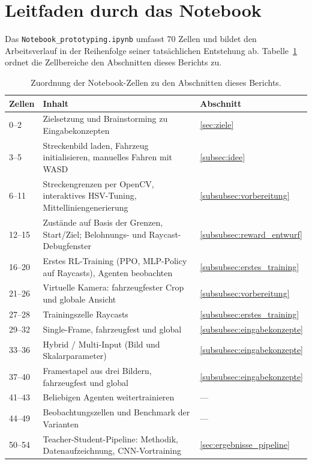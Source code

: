 \section{Leitfaden durch das Notebook}

Das \texttt{Notebook\_prototyping.ipynb} umfasst \num{70} Zellen und bildet den Arbeitsverlauf in der Reihenfolge seiner tatsächlichen Entstehung ab. Tabelle~\ref{tab:notebook} ordnet die Zellbereiche den Abschnitten dieses Berichts zu.

\begin{table}[htbp]
  \centering
  \caption{Zuordnung der Notebook-Zellen zu den Abschnitten dieses Berichts.}
  \label{tab:notebook}
  \small
  \begin{tabularx}{\linewidth}{@{}l X l@{}}
    \toprule
    \textbf{Zellen} & \textbf{Inhalt} & \textbf{Abschnitt} \\
    \midrule
    0--2   & Zielsetzung und Brainstorming zu Eingabekonzepten & \ref{sec:ziele} \\
    3--5   & Streckenbild laden, Fahrzeug initialisieren, manuelles Fahren mit WASD & \ref{subsec:idee} \\
    6--11  & Streckengrenzen per OpenCV, interaktives HSV-Tuning, Mittelliniengenerierung & \ref{subsubsec:vorbereitung} \\
    12--15 & Zustände auf Basis der Grenzen, Start/Ziel; Belohnungs- und Raycast-Debugfenster & \ref{subsubsec:reward_entwurf} \\
    16--20 & Erstes RL-Training (PPO, MLP-Policy auf Raycasts), Agenten beobachten & \ref{subsubsec:erstes_training} \\
    21--26 & Virtuelle Kamera: fahrzeugfester Crop und globale Ansicht & \ref{subsubsec:vorbereitung} \\
    27--28 & Trainingszelle Raycasts & \ref{subsubsec:erstes_training} \\
    29--32 & Single-Frame, fahrzeugfest und global & \ref{subsubsec:eingabekonzepte} \\
    33--36 & Hybrid / Multi-Input (Bild und Skalarparameter) & \ref{subsubsec:eingabekonzepte} \\
    37--40 & Framestapel aus drei Bildern, fahrzeugfest und global & \ref{subsubsec:eingabekonzepte} \\
    41--43 & Beliebigen Agenten weitertrainieren & --- \\
    44--49 & Beobachtungszellen und Benchmark der Varianten & --- \\
    50--54 & Teacher-Student-Pipeline: Methodik, Datenaufzeichnung, CNN-Vortraining & \ref{sec:ergebnisse_pipeline} \\

\end{tabularx}
\end{table}
